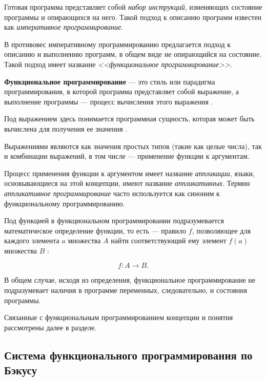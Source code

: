 Готовая программа представляет собой \textit{набор инструкций}, изменяющих
состояние программы и опирающихся на него. Такой подход к описанию программ 
известен как \textit{императивное программирование}.

В противовес императивному программированию предлагается подход к описанию
и выполнению программ, в общем виде не опирающийся на состояние. Такой подход
имеет название \textit{<<функциональное программирование>>}.

\textbf{Функциональное программирование} --- это стиль или парадигма
программирования, в которой программа представляет собой выражение, а
выполнение программы --- процесс вычисления этого выражения \cite{harrison97}. %

Под выражением здесь понимается программная сущность, которая
может быть вычислена для получения ее значения \cite{sicp}. %

Выражениями являются как значения простых типов (такие как целые числа),
так и комбинации выражений, в том числе --- применение функции к аргументам.

Процесс применения функции к аргументом имеет название \textit{аппликации}, языки,
основывающиеся на этой концепции, имеют название \textit{аппликативных}. Термин
\textit{аппликативное программирование} часто используется как синоним к функциональному
программированию.

Под функцией в функциональном программировании подразумевается математическое определение функции, 
то есть --- правило $f$, позволяющее для каждого элемента $a$ множества $A$ найти соответствующий 
ему элемент $f(a)$ множества $B$ \cite[с.~12]{algrebrakirkinskii}: %

\begin{equation}
    \label{eq:function_equation}
    f : A \rightarrow B.
\end{equation}

В общем случае, исходя из определения, функциональное программирование 
не подразумевает наличия в программе переменных, следовательно, и состояния 
программы.

Связанные с функциональным программированием концепции и понятия рассмотрены
далее в разделе.

\subsection{Система функционального программирования по Бэкусу}\label{sec:ch1/sec3/subsec1}

